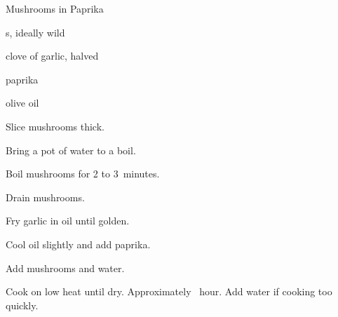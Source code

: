 \begin{recipe}{Mushrooms in Paprika}{}{}

\begin{ingredients}
\item {}s, ideally wild
\item clove of garlic, halved
\item paprika
\item olive oil
\end{ingredients}

\begin{directions}
\item Slice mushrooms  thick.
\item Bring a pot of water to a boil.
\item Boil mushrooms for 2 to 3~minutes.
\item Drain mushrooms.
\item Fry garlic in oil until golden.
\item Cool oil slightly and add paprika.
\item Add mushrooms and \C{\half} water.
\item Cook on low heat until dry. Approximately \half~hour. Add water if cooking too quickly.
\end{directions}

\end{recipe}
